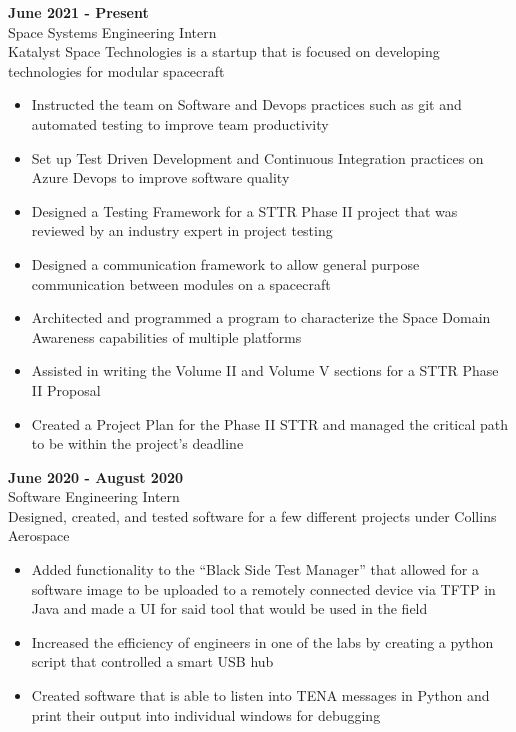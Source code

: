 \documentclass[10pt]{article}
\newcommand{\entrySpacing}{4pt}
\begin{document}
\noindent\begin{minipage}{\linewidth}
 \hfill \textbf{June 2021 - Present}\\
Space Systems Engineering Intern\hfill \\Katalyst Space Technologies is a startup that is focused on developing technologies for modular spacecraft
\begin{itemize}[noitemsep,nolistsep]
\item Instructed the team on Software and Devops practices such as git and automated testing to improve team productivity
\item Set up Test Driven Development and Continuous Integration practices on Azure Devops to improve software quality
\item Designed a Testing Framework for a STTR Phase II project that was reviewed by an industry expert in project testing
\item Designed a communication framework to allow general purpose communication between modules on a spacecraft
\item Architected and programmed a program to characterize the Space Domain Awareness capabilities of multiple platforms
\item Assisted in writing the Volume II and Volume V sections for a STTR Phase II Proposal
\item Created a Project Plan for the Phase II STTR and managed the critical path to be within the project's deadline
\end{itemize}


\end{minipage}
\vspace{\entrySpacing}

\noindent\begin{minipage}{\linewidth}
 \hfill \textbf{June 2020 - August 2020}\\
Software Engineering Intern\hfill \\Designed, created, and tested software for a few different projects under Collins Aerospace
\begin{itemize}[noitemsep,nolistsep]
\item Added functionality to the “Black Side Test Manager” that allowed for a software image to be uploaded to a remotely connected device via TFTP in Java and made a UI for said tool that would be used in the field
\item Increased the efficiency of engineers in one of the labs by creating a python script that controlled a smart USB hub
\item Created software that is able to listen into TENA messages in Python and print their output into individual windows for debugging
\end{itemize}


\end{minipage}
\vspace{\entrySpacing}
\end{document}

